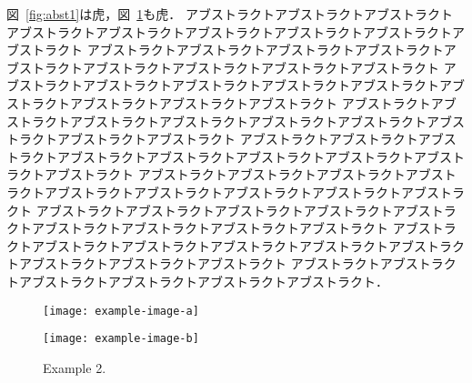 \documentclass[
    paper=a4paper,      %
    article,            %
    fleqn,              %
    fontsize=12pt,      %
    jafontsize=12pt,    %
    head_space=30mm,    %
    foot_space=20mm,    %
    gutter=18mm,        %
    fore-edge=18mm      %
    ]{jlreq}            %
\begin{document}
図~\ref{fig:abst1}は虎，図~\ref{fig:abst2}も虎．
アブストラクトアブストラクトアブストラクトアブストラクトアブストラクトアブストラクトアブストラクトアブストラクトアブストラクト
アブストラクトアブストラクトアブストラクトアブストラクトアブストラクトアブストラクトアブストラクトアブストラクトアブストラクト
アブストラクトアブストラクトアブストラクトアブストラクトアブストラクトアブストラクトアブストラクトアブストラクトアブストラクト
アブストラクトアブストラクトアブストラクトアブストラクトアブストラクトアブストラクトアブストラクトアブストラクトアブストラクト
アブストラクトアブストラクトアブストラクトアブストラクトアブストラクトアブストラクトアブストラクトアブストラクトアブストラクト
アブストラクトアブストラクトアブストラクトアブストラクトアブストラクトアブストラクトアブストラクトアブストラクトアブストラクト
アブストラクトアブストラクトアブストラクトアブストラクトアブストラクトアブストラクトアブストラクトアブストラクトアブストラクト
アブストラクトアブストラクトアブストラクトアブストラクトアブストラクトアブストラクトアブストラクトアブストラクトアブストラクト
アブストラクトアブストラクトアブストラクトアブストラクトアブストラクトアブストラクト．

\begin{figure}[b]
	\centering
	\begin{minipage}{0.45\columnwidth}
		\centering
		\texttt{[image: example-image-a]}
		\caption{Example 1.}
		\label{fig:abst1}
	\end{minipage}
	\hspace{10mm}
	\begin{minipage}{0.45\columnwidth}
		\centering
		\texttt{[image: example-image-b]}
		\caption{Example 2.}
		\label{fig:abst2}
	\end{minipage}
\end{figure}

\end{document}

